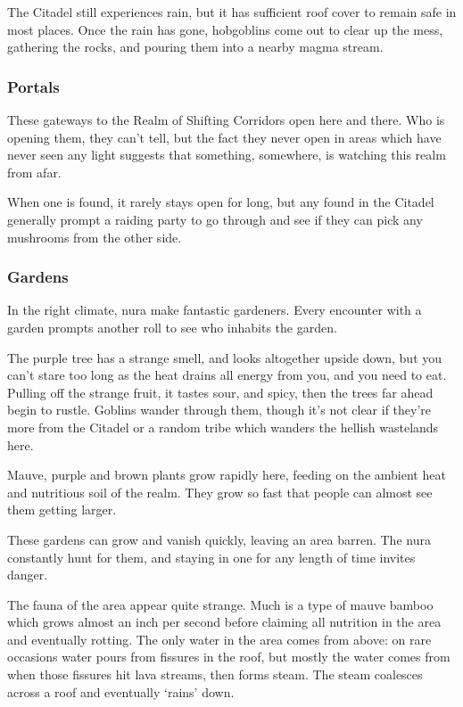 \begin{multicols}{2}
The Citadel still experiences rain, but it has sufficient roof cover to remain safe in most places.
Once the rain has gone, hobgoblins come out to clear up the mess, gathering the rocks, and pouring them into a nearby magma stream.

\subsubsection{Portals}

These gateways to the Realm of Shifting Corridors open here and there.
Who is opening them, they can't tell, but the fact they never open in areas which have never seen any light suggests that something, somewhere, is watching this realm from afar.

When one is found, it rarely stays open for long, but any found in the Citadel generally prompt a raiding party to go through and see if they can pick any mushrooms from the other side.

\subsubsection{Gardens}

In the right climate, nura make fantastic gardeners.
Every encounter with a garden prompts another roll to see who inhabits the garden.

\begin{boxtext}

  The purple tree has a strange smell, and looks altogether upside down, but you can't stare too long as the heat drains all energy from you, and you need to eat.
Pulling off the strange fruit, it tastes sour, and spicy, then the trees far ahead begin to rustle.
Goblins wander through them, though it's not clear if they're more from the Citadel or a random tribe which wanders the hellish wastelands here.

\end{boxtext}

Mauve, purple and brown plants grow rapidly here, feeding on the ambient heat and nutritious soil of the realm.
They grow so fast that people can almost see them getting larger.

These gardens can grow and vanish quickly, leaving an area barren.
The nura constantly hunt for them, and staying in one for any length of time invites danger.

The fauna of the area appear quite strange.
Much is a type of mauve bamboo which grows almost an inch per second before claiming all nutrition in the area and eventually rotting.
The only water in the area comes from above: on rare occasions water pours from fissures in the roof, but mostly the water comes from when those fissures hit lava streams, then forms steam.
The steam coalesces across a roof and eventually `rains' down.


\end{multicols}
